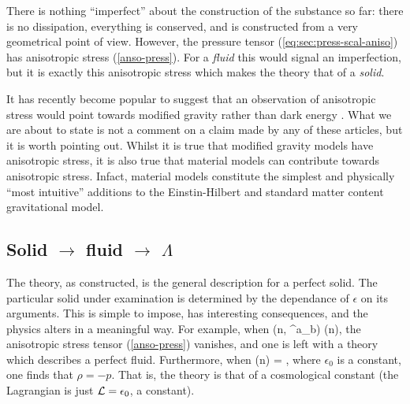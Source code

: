 There is nothing ``imperfect'' about the construction of the substance so far: there is no dissipation,   everything is conserved, and is constructed from a very geometrical point of view. However, the pressure tensor (\ref{eq:sec:press-scal-aniso}) has anisotropic stress (\ref{anso-press}). For a \textit{fluid} this would signal an imperfection, but it is exactly this anisotropic stress which makes the theory  that of a  \textit{solid}.

It has recently become popular to suggest that an observation of anisotropic stress would point towards modified gravity rather than dark energy \cite{Bellini:2014fua, Saltas:2014dha, Amendola:2014wma, Linder:2014fna}. What we are about to state is not a comment on a claim made by any of these articles, but it is worth pointing out. Whilst it is true that modified gravity models have anisotropic stress, it is also true that material models can contribute towards anisotropic stress. Infact, material models constitute the simplest and physically ``most intuitive'' additions to the Einstin-Hilbert and standard matter content gravitational model.

\subsection{Solid $\rightarrow$ fluid $\rightarrow$ $\Lambda$}
The theory, as constructed, is the general description for a perfect solid. The particular solid under examination is determined by the dependance of $\epsilon$ on its   arguments. This is simple to impose,   has interesting consequences, and  the physics alters in a meaningful way.  For example, when
\bea
\epsilon\left(n, {\eta^a}_b\right) \longrightarrow \epsilon(n),
\eea
  the anisotropic stress tensor (\ref{anso-press}) vanishes, and one is left with a theory which describes a perfect fluid. Furthermore, when 
\bea
\epsilon(n) = ,
\eea
where $\epsilon_0$ is a constant, one finds that $\rho = - p$.  That is, the theory is that of a cosmological constant (the Lagrangian is just $\mathcal{L} = \epsilon_0$, a constant).

